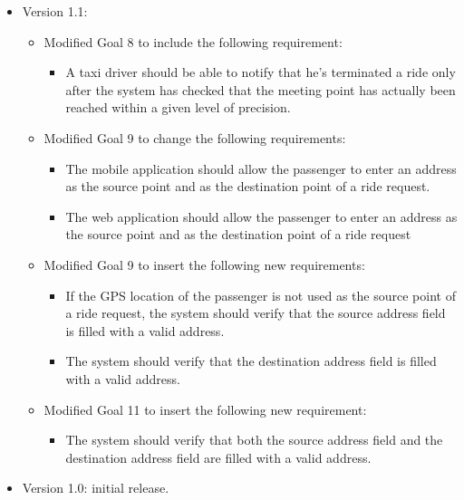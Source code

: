 \begin{itemize}
	\item Version 1.1:
	\begin{itemize}
	\item Modified Goal 8 to include the following requirement: 
	\begin{itemize}
	\item A taxi driver should be able to notify that he's terminated a ride only after the system has checked that the meeting point has actually been reached within a given level of precision.
	\end{itemize}
	\item Modified Goal 9 to change the following requirements:
	\begin{itemize}
	\item The mobile application should allow the passenger to enter an address as the source point and as the destination point of a ride request.
	\item The web application should allow the passenger to enter an address as the source point and as the destination point of a ride request
	\end{itemize}
	\item Modified Goal 9 to insert the following new requirements:
	\begin{itemize}
	\item If the GPS location of the passenger is not used as the source point of a ride request, the system should verify that the source address field is filled with a valid address.
	\item The system should verify that the destination address field is filled with a valid address.
	\end{itemize}
	\item Modified Goal 11 to insert the following new requirement:
	\begin{itemize}
	\item The system should verify that both the source address field and the destination address field are filled with a valid address.
	\end{itemize}
	\end{itemize}
	\item Version 1.0: initial release.
\end{itemize}